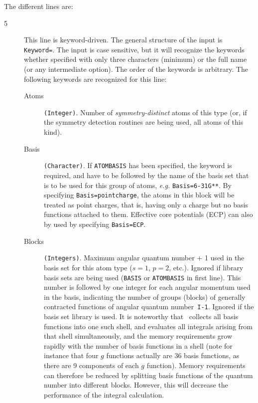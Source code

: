 The different lines are:
\begin{description}
\item[5] This line is keyword-driven. The general structure of the input is
\verb|Keyword=|. The input is case sensitive, but it will recognize
the keywords whether specified with only three characters (minimum) or
the full name (or any intermediate option). The order of the keywords
is arbitrary. The following keywords are
recognized for this line:
\begin{description}
\item[Atoms] \verb|(Integer)|. Number of {\em
  symmetry-distinct} atoms of 
this type (or, if the symmetry detection routines are being used, all
atoms of this kind).
\item[Basis] \verb|(Character)|. If \verb|ATOMBASIS| has been specified,
  the keyword is required, and have to be followed by the name of the
  basis set that is to be used for this group of atoms, {\it e.g.\/}
  \verb|Basis=6-31G**|. By specifying
  \verb|Basis=pointcharge|, the
  atoms in this block will be treated as point charges, that is,
  having only a charge but no basis functions attached to
  them. Effective core potentials (ECP) can also by used by specifying
  \verb|Basis=ECP|.
\item[Blocks] \verb|(Integers)|. Maximum angular quantum number + 1 used in the
basis set for this atom type ($s=1$, $p=2$, etc.).
Ignored if library basis sets are being used (\verb|BASIS| or
\verb|ATOMBASIS| in first line). This number is followed by one
integer for each angular momentum used in the basis, indicating 
the number of groups (blocks) of generally contracted
functions of angular quantum number~{\tt I-1}.
Ignored if the basis set library is used. \newline
It is noteworthy that
\dalton\ collects all basis functions into one such shell, and
evaluates all integrals arising from that 
shell simultaneously, and
the memory requirements grow rapidly with the number of basis
functions in a shell (note for instance that four $g$ functions
actually are 36
basis functions, as there are 9 components of each $g$
function). Memory requirements can therefore be reduced
by splitting
basis functions of the quantum number into different blocks. However,
this will decrease the performance of the
integral calculation.

\end{description}
\end{description}
